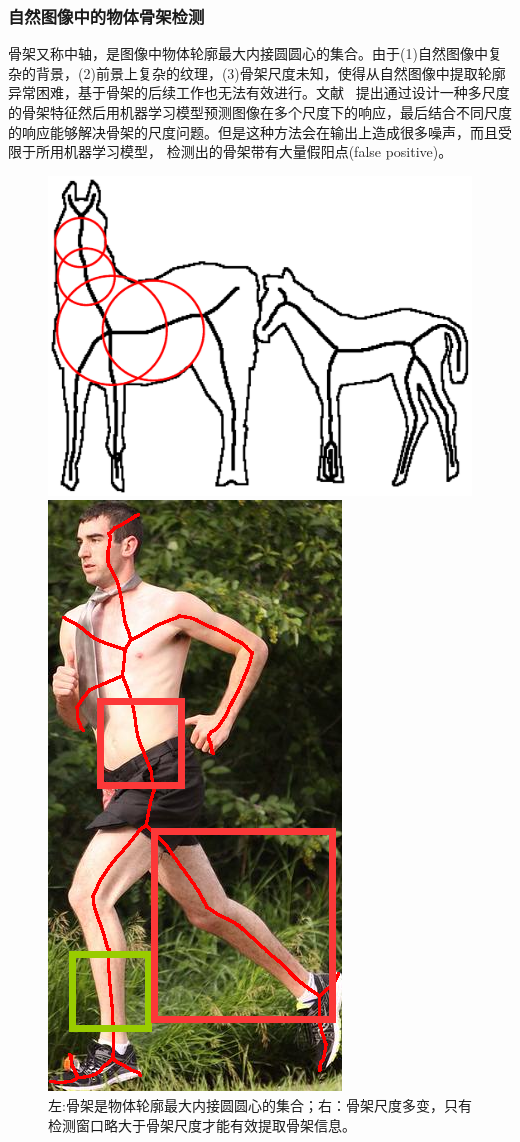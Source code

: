 \documentclass[UTF8]{ctexart}
\numberwithin{equation}{section} %
\numberwithin{table}{section} %
\begin{document}
\subsubsection{自然图像中的物体骨架检测}
骨架又称中轴，是图像中物体轮廓最大内接圆圆心的集合。由于(1)自然图像中复杂的背景，(2)前景上复杂的纹理，(3)骨架尺度未知，使得从自然图像中提取轮廓异常困难，基于骨架的后续工作也无法有效进行。文献~\cite{sie2013detecting,tsogkas2012learning}
提出通过设计一种多尺度的骨架特征然后用机器学习模型预测图像在多个尺度下的响应，最后结合不同尺度的响应能够解决骨架的尺度问题。但是这种方法会在输出上造成很多噪声，而且受限于所用机器学习模型，
检测出的骨架带有大量假阳点(false positive)。
\begin{figure}[!htb]
  \begin{minipage}[b]{0.7\linewidth}
    \includegraphics[width=.8\linewidth]{figures/sk_edge}
    \vspace{4ex}
  \end{minipage}%
  \begin{minipage}[b]{0.5\linewidth}
    \includegraphics[width=.3\linewidth]{figures/sk_diff_scale_bbox} 
    \vspace{4ex}
  \end{minipage} 
  \caption{左:骨架是物体轮廓最大内接圆圆心的集合；右：骨架尺度多变，只有检测窗口略大于骨架尺度才能有效提取骨架信息。}
  \label{fig:sk_scale_edge}
\end{figure}
\end{document}
